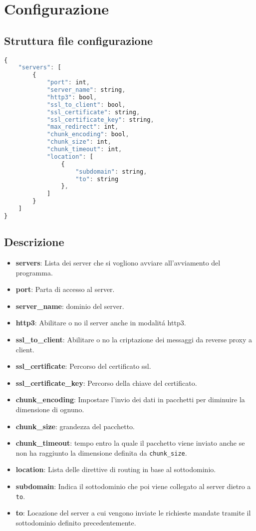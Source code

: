 \section{Configurazione}

\subsection{Struttura file configurazione}
\begin{lstlisting}[language=Javascript]
  {
	"servers": [
    	{
        	"port": int,
        	"server_name": string,
        	"http3": bool,
        	"ssl_to_client": bool,
        	"ssl_certificate": string,
        	"ssl_certificate_key": string,
        	"max_redirect": int,
        	"chunk_encoding": bool,
        	"chunk_size": int,
        	"chunk_timeout": int,
        	"location": [
            	{
                	"subdomain": string,
                	"to": string
            	},
        	]
    	}
	]
}
\end{lstlisting}
\subsection{Descrizione}
\begin{itemize}[label={}]
  \item \textbf{servers}: Lista dei server che si vogliono avviare all'avviamento del programma.
  \item \textbf{port}: Parta di accesso al server.
  \item \textbf{server\_name}: dominio del server.
  \item \textbf{http3}: Abilitare o no il server anche in modalitá http3.
  \item \textbf{ssl\_to\_client}: Abilitare o no la criptazione dei messaggi da reverse proxy a client.
  \item \textbf{ssl\_certificate}: Percorso del certificato ssl.
  \item \textbf{ssl\_certificate\_key}: Percorso della chiave del certificato.
  \item \textbf{chunk\_encoding}: Impostare l'invio dei dati in pacchetti per diminuire la dimensione di ognuno.
  \item \textbf{chunk\_size}: grandezza del pacchetto.
  \item \textbf{chunk\_timeout}: tempo entro la quale il pacchetto viene inviato anche se non ha raggiunto la dimensione definita da \texttt{chunk\_size}.
  \item \textbf{location}: Lista delle direttive di routing in base al sottodominio.
  \item \textbf{subdomain}: Indica il sottodominio che poi viene collegato al server dietro a \texttt{to}.
  \item \textbf{to}: Locazione del server a cui vengono inviate le richieste mandate tramite il sottodominio definito precedentemente.
\end{itemize}

